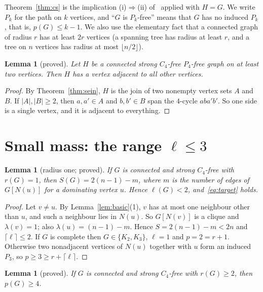 \documentclass[11pt]{amsart}
\newtheorem{lemma}[theorem]{Lemma}
\theoremstyle{definition}
\theoremstyle{remark}
\newcommand{\lr}{\ell}
\newcommand{\pp}{p}
\begin{document}
Theorem~\ref{thm:cs} is the implication (i)$\Rightarrow$(ii) of~\cite[Theorem~5]{cs} applied with $H=G$. We write $P_k$ for the path on $k$ vertices, and ``$G$ is $P_k$-free'' means that $G$ has no induced $P_k$, that is, $\pp(G)\le k-1$. We also use the elementary fact that a connected graph of radius $r$ has at least $2r$ vertices (a spanning tree has radius at least $r$, and a tree on $n$ vertices has radius at most $\lfloor n/2\rfloor$).

\begin{lemma}[proved]\label{lem:join}
Let $H$ be a connected strong $C_4$-free $P_4$-free graph on at least two vertices. Then $H$ has a vertex adjacent to all other vertices.
\end{lemma}

\begin{proof}
By Theorem~\ref{thm:sein}, $H$ is the join of two nonempty vertex sets $A$ and $B$. If $|A|,|B|\ge2$, then $a,a'\in A$ and $b,b'\in B$ span the $4$-cycle $aba'b'$. So one side is a single vertex, and it is adjacent to everything.
\end{proof}
\section{Small mass: the range \texorpdfstring{$\lr\le3$}{l<=3}}\label{sec:small}

\begin{lemma}[radius one; proved]\label{lem:r1}
If $G$ is connected and strong $C_4$-free with $r(G)=1$, then $S(G)=2(n-1)-m$, where $m$ is the number of edges of $G[N(u)]$ for a dominating vertex $u$. Hence $\lr(G)<2$, and~\eqref{eq:target} holds.
\end{lemma}

\begin{proof}
Let $v\ne u$. By Lemma~\ref{lem:basic}(1), $v$ has at most one neighbour other than $u$, and such a neighbour lies in $N(u)$. So $G[N(v)]$ is a clique and $\lambda(v)=1$; also $\lambda(u)=(n-1)-m$. Hence $S=2(n-1)-m<2n$ and $\lceil\lr\rceil\le2$. If $G$ is complete then $G\in\{K_2,K_3\}$, $\lr=1$ and $\pp=2=r+1$. Otherwise two nonadjacent vertices of $N(u)$ together with $u$ form an induced $P_3$, so $\pp\ge3\ge r+\lceil\lr\rceil$.
\end{proof}

\begin{lemma}[proved]\label{lem:r2}
If $G$ is connected and strong $C_4$-free with $r(G)\ge2$, then $\pp(G)\ge4$.
\end{lemma}
\end{document}
